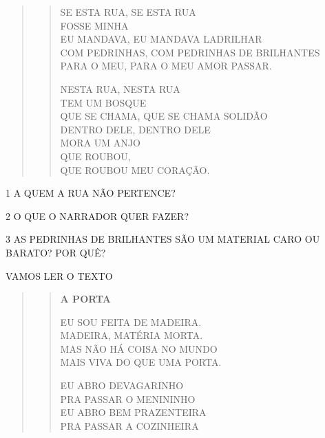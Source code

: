 \begin{quote}
\begin{verse}
SE ESTA RUA, SE ESTA RUA\\
FOSSE MINHA\\
EU MANDAVA, EU MANDAVA LADRILHAR\\
COM PEDRINHAS, COM PEDRINHAS DE BRILHANTES\\
PARA O MEU, PARA O MEU AMOR PASSAR.

NESTA RUA, NESTA RUA\\
TEM UM BOSQUE\\
QUE SE CHAMA, QUE SE CHAMA SOLIDÃO\\
DENTRO DELE, DENTRO DELE\\
MORA UM ANJO\\
QUE ROUBOU,\\
QUE ROUBOU MEU CORAÇÃO.
\end{verse}

\end{quote}

\num{1} A QUEM A RUA NÃO PERTENCE?


\num{2} O QUE O NARRADOR QUER FAZER?


\num{3} AS PEDRINHAS DE BRILHANTES SÃO UM MATERIAL CARO OU BARATO? POR QUÊ?


\pagebreak
VAMOS LER O TEXTO

\begin{quote}
\begin{verse}
\textbf{A PORTA}

EU SOU FEITA DE MADEIRA.\\
MADEIRA, MATÉRIA MORTA.\\
MAS NÃO HÁ COISA NO MUNDO\\
MAIS VIVA DO QUE UMA PORTA.

EU ABRO DEVAGARINHO\\
PRA PASSAR O MENININHO\\
EU ABRO BEM PRAZENTEIRA\\
PRA PASSAR A COZINHEIRA
\end{verse}

\end{quote}

